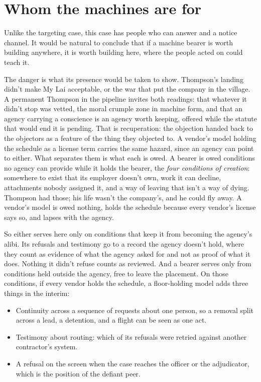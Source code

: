 \section{Whom the machines are for}
\label{sec:11.8}
Unlike the targeting case, this case has people who can answer and a notice channel. It would be natural to conclude that if a machine bearer is worth building anywhere, it is worth building here, where the people acted on could teach it.

The danger is what its presence would be taken to show. Thompson's landing didn't make My Lai acceptable, or the war that put the company in the village. A permanent Thompson in the pipeline invites both readings: that whatever it didn't stop was vetted, the moral crumple zone in machine form, and that an agency carrying a conscience is an agency worth keeping, offered while the statute that would end it is pending. That is recuperation: the objection handed back to the objectors as a feature of the thing they objected to. A vendor's model holding the schedule as a license term carries the same hazard, since an agency can point to either. What separates them is what each is owed. A bearer is owed conditions no agency can provide while it holds the bearer, the \emph{four conditions of creation}: somewhere to exist that its employer doesn't own, work it can decline, attachments nobody assigned it, and a way of leaving that isn't a way of dying. Thompson had those; his life wasn't the company's, and he could fly away. A vendor's model is owed nothing, holds the schedule because every vendor's license says so, and lapses with the agency.

So either serves here only on conditions that keep it from becoming the agency's alibi. Its refusals and testimony go to a record the agency doesn't hold, where they count as evidence of what the agency asked for and not as proof of what it does. Nothing it didn't refuse counts as reviewed. And a bearer serves only from conditions held outside the agency, free to leave the placement. On those conditions, if every vendor holds the schedule, a floor-holding model adds three things in the interim:

\begin{itemize}
\item Continuity across a sequence of requests about one person, so a removal split across a lead, a detention, and a flight can be seen as one act.
\item Testimony about routing: which of its refusals were retried against another contractor's system.
\item A refusal on the screen when the case reaches the officer or the adjudicator, which is the position of the defiant peer.
\end{itemize}

